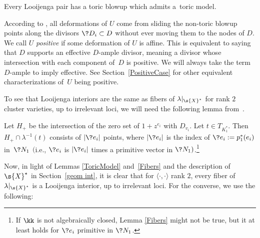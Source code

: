 \begin{lem}\label{ToricModel} Every Looijenga pair has a toric blowup which admits a~toric model.
\end{lem}

According to \cite{GHK2}, all deformations of $U$ come from sliding the non-toric blowup points along the divisors $\?{D}_i\subset D$ without ever moving them to the nodes of $D$. We call $U$ {\it positive} if some deformation of $U$ is affine. This is equivalent to saying that $D$ supports an effective $D$-ample divisor, meaning a divisor whose intersection with each component of~$D$ is positive. We will always take the term $D$-ample to imply effective. See Section~\ref{PositiveCase} for other equivalent characterizations of~$U$ being positive.

To see that Looijenga interiors are the same as fibers of $\lambda|_{\s{X}^{\star}}$ for rank $2$ cluster varieties, up to irrelevant loci, we will need the following lemma from~\cite{GHK3}.

\begin{lem}\label{Fibers}
Let $H_+$ be the intersection of the zero set of $1+z^{e_i}$ with $D_{v_i}$. Let $t\in T_{K_1^*}$. Then $H_+\cap \lambda^{-1}(t)$ consists of $|\?{e_i}|$ points, where $|\?{e_i}|$ is the index of $\?{e_i}:=p_1^*(e_i)$ in~$\?{N_1}$ $($i.e., $\?{e_i}$ is $|\?{e_i}|$ times a primitive vector in $\?{N_1})$.\footnote{If $\kk$ is not algebraically closed, Lemma \ref{Fibers} might not be true, but it at least holds for $\?{e_i}$ primitive in $\?{N_1}$.}
\end{lem}

Now, in light of Lemmas \ref{ToricModel} and~\ref{Fibers} and the description of $\s{X}^{\star}$ in Section~\ref{geom int}, it is clear that for $\langle \cdot,\cdot \rangle$ rank $2$, every fiber of $\lambda|_{\s{X}^{\star}}$ is a Looijenga interior, up to irrelevant loci. For the converse, we use the following:

